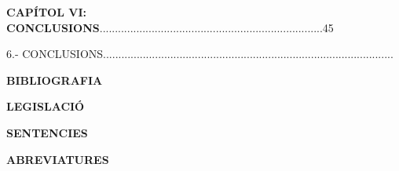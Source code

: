 \documentclass[12pt]{article}
\begin{document}
\vspace{\baselineskip}

\vspace{\baselineskip}
\begin{justify}
\textbf{CAPÍTOL VI: CONCLUSIONS}.........................................................................45
\end{justify}\par


\vspace{\baselineskip}

\vspace{\baselineskip}
\begin{justify}
6.- CONCLUSIONS...............................................................................................
\end{justify}\par


\vspace{\baselineskip}

\vspace{\baselineskip}
\begin{justify}
\textbf{BIBLIOGRAFIA}
\end{justify}\par


\vspace{\baselineskip}

\vspace{\baselineskip}
\begin{justify}
\textbf{LEGISLACIÓ }
\end{justify}\par


\vspace{\baselineskip}

\vspace{\baselineskip}
\begin{justify}
\textbf{SENTENCIES}
\end{justify}\par


\vspace{\baselineskip}

\vspace{\baselineskip}
\begin{Center}
{\fontsize{16pt}{19.2pt}\selectfont \textbf{ABREVIATURES}\par}
\end{Center}\par


\vspace{\baselineskip}
\end{document}

